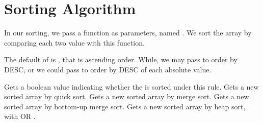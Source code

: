 \section{Sorting Algorithm}
In our sorting, we pass a function as parameters, named . We sort the array by comparing each two value with this  function.

The default of  is , that is ascending order. While, we may pass  to order by DESC, or we could pass  to order by DESC of each absolute value.

Gets a boolean value indicating whether the  is sorted under this  rule.
Gets a new sorted array by quick sort.
Gets a new sorted array by merge sort.
Gets a new sorted array by bottom-up merge sort.
Gets a new sorted array by heap sort, with  OR .
